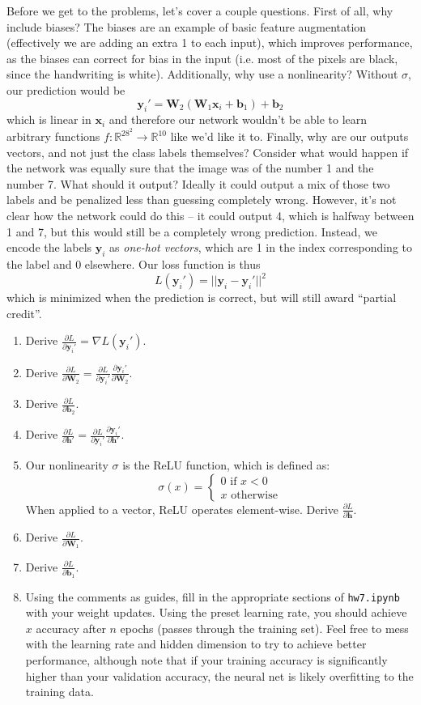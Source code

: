 \documentclass{article}
\begin{document}
Before we get to the problems, let's cover a couple questions. First of all, why include biases? The biases are an example of basic feature augmentation (effectively we are adding an extra 1 to each input), which improves performance, as the biases can correct for bias in the input (i.e. most of the pixels are black, since the handwriting is white). Additionally, why use a nonlinearity? Without $\sigma$, our prediction would be $$\mathbf{y}_i' = \mathbf{W}_2(\mathbf{W}_1\mathbf{x}_i + \mathbf{b}_1) + \mathbf{b}_2$$ which is linear in $\mathbf{x}_i$ and therefore our network wouldn't be able to learn arbitrary functions $f: \mathbb{R}^{28^2} \rightarrow \mathbb{R}^{10}$ like we'd like it to. Finally, why are our outputs vectors, and not just the class labels themselves? Consider what would happen if the network was equally sure that the image was of the number 1 and the number 7. What should it output? Ideally it could output a mix of those two labels and be penalized less than guessing completely wrong. However, it's not clear how the network could do this -- it could output 4, which is halfway between 1 and 7, but this would still be a completely wrong prediction. Instead, we encode the labels $\mathbf{y}_i$ as \textit{one-hot vectors}, which are 1 in the index corresponding to the label and 0 elsewhere. Our loss function is thus $$L(\mathbf{y}_i') = || \mathbf{y}_i - \mathbf{y}_i'||^2$$ which is minimized when the prediction is correct, but will still award ``partial credit''.
\begin{enumerate}[label=\arabic*.]
\item Derive $\frac{\partial L}{\partial \mathbf{y}_i'} = \nabla L(\mathbf{y}_i')$.
\item Derive $\frac{\partial L}{\partial \mathbf{W}_2} = \frac{\partial L}{\partial \mathbf{y}_i'}\frac{\partial \mathbf{y}_i'}{\partial \mathbf{W}_2}$.
\item Derive $\frac{\partial L}{\partial \mathbf{b}_2}$.
\item Derive $\frac{\partial L}{\partial \mathbf{h'}} = \frac{\partial L}{\partial \mathbf{y}_i'}\frac{\partial \mathbf{y}_i'}{\partial \mathbf{h'}}$.
\item Our nonlinearity $\sigma$ is the ReLU function, which is defined as: $$ \sigma(x) = \begin{cases} 0 \text{ if } x < 0 \\ x \text{ otherwise} \end{cases}$$ When applied to a vector, ReLU operates element-wise. Derive $\frac{\partial L}{\partial \mathbf{h}}$.
\item Derive $\frac{\partial L}{\partial \mathbf{W}_1}$.
\item Derive $\frac{\partial L}{\partial \mathbf{b}_1}$.
\item Using the comments as guides, fill in the appropriate sections of \verb|hw7.ipynb| with your weight updates. Using the preset learning rate, you should achieve $x$ accuracy after $n$ epochs (passes through the training set). Feel free to mess with the learning rate and hidden dimension to try to achieve better performance, although note that if your training accuracy is significantly higher than your validation accuracy, the neural net is likely overfitting to the training data.
\end{enumerate}
\end{document}

